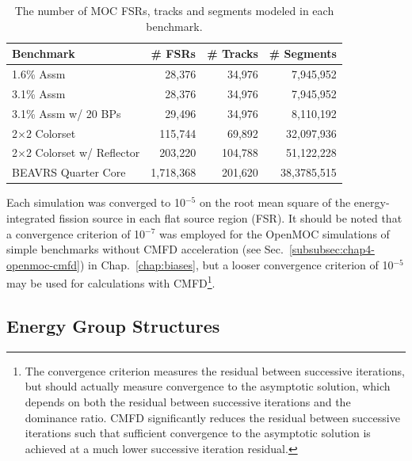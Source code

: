 \begin{table}[h!]
  \centering
  \caption[Number of FSRs, tracks and segments for each benchmark]{The number of \ac{MOC} \ac{FSR}s, tracks and segments modeled in each benchmark.}
  \small
  \label{table:chap8-num-fsrs-tracks-segments}
  \vspace{6pt}
  \begin{tabular}{l r r r}
  \toprule
  \rowcolor{lightgray}
  \textbf{Benchmark} &
  \multicolumn{1}{c}{\cellcolor{lightgray} \textbf{\# \ac{FSR}s}} &
  \multicolumn{1}{c}{\cellcolor{lightgray} \textbf{\# Tracks}} &
  \multicolumn{1}{c}{\cellcolor{lightgray} \textbf{\# Segments}} \\
  \midrule
1.6\% Assm & 28,376 & 34,976 & 7,945,952 \\
  \midrule
3.1\% Assm & 28,376 & 34,976 & 7,945,952 \\
  \midrule
3.1\% Assm w/ 20 BPs & 29,496 & 34,976 & 8,110,192  \\
  \midrule
2$\times$2 Colorset & 115,744 & 69,892 & 32,097,936 \\
  \midrule
2$\times$2 Colorset w/ Reflector & 203,220 & 104,788 & 51,122,228 \\
  \midrule
\ac{BEAVRS} Quarter Core & 1,718,368 & 201,620 & 38,3785,515 \\
  \bottomrule
\end{tabular}
\end{table}

Each simulation was converged to 10$^{-5}$ on the root mean square of the energy-integrated fission source in each flat source region (FSR). It should be noted that a convergence criterion of 10$^{-7}$ was employed for the OpenMOC simulations of simple benchmarks without \ac{CMFD} acceleration (see Sec.~\ref{subsubsec:chap4-openmoc-cmfd}) in Chap.~\ref{chap:biases}, but a looser convergence criterion of 10$^{-5}$ may be used for calculations with \ac{CMFD}\footnote{The convergence criterion measures the residual between successive iterations, but should actually measure convergence to the asymptotic solution, which depends on both the residual between successive iterations and the dominance ratio. \ac{CMFD} significantly reduces the residual between successive iterations such that sufficient convergence to the asymptotic solution is achieved at a much lower successive iteration residual.}.

\subsection{Energy Group Structures}
\label{subsec:chap8-energy-groups}

